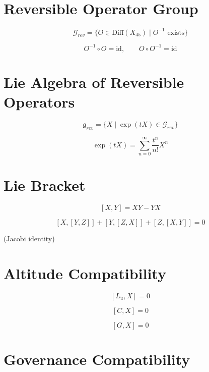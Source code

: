 
\section*{Reversible Operator Group}

\[
\mathcal{G}_{rev}
= \{ O \in \mathrm{Diff}(X_{45}) \mid O^{-1} \text{ exists} \}
\]

\[
O^{-1} \circ O = \mathrm{id},\qquad
O \circ O^{-1} = \mathrm{id}
\]


\section*{Lie Algebra of Reversible Operators}

\[
\mathfrak{g}_{rev}
= \{ X \mid \exp(tX) \in \mathcal{G}_{rev} \}
\]

\[
\exp(tX)
= \sum_{n=0}^{\infty} \frac{t^n}{n!} X^n
\]


\section*{Lie Bracket}

\[
[X,Y] = XY - YX
\]

\[
[X,[Y,Z]] + [Y,[Z,X]] + [Z,[X,Y]] = 0
\]

(Jacobi identity)


\section*{Altitude Compatibility}

\[
[L_u, X] = 0
\]

\[
[C, X] = 0
\]

\[
[G, X] = 0
\]


\section*{Governance Compatibility}

